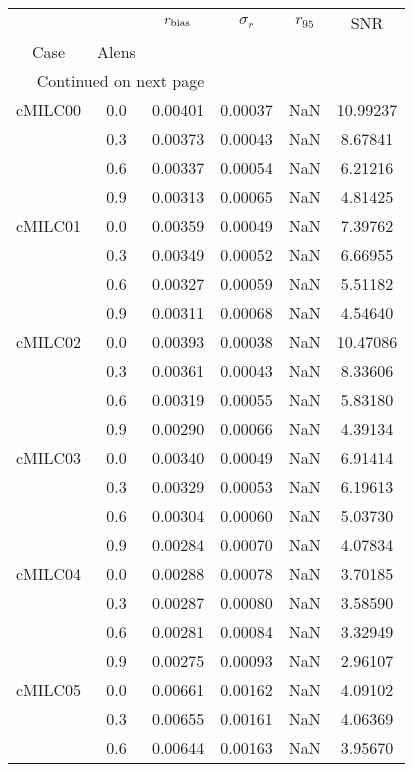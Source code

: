 \begin{longtable}{cccccc}
\toprule
        &     &  $r_{\rm bias}$  &  $\sigma_r$ &  $r_{95}$ &      SNR \\
Case & Alens &                  &             &           &          \\
\midrule
\endhead
\midrule
\multicolumn{3}{r}{{Continued on next page}} \\
\midrule
\endfoot

\bottomrule
\endlastfoot
cMILC00 & 0.0 & 0.00401 & 0.00037 & NaN & 10.99237 \\
        & 0.3 & 0.00373 & 0.00043 & NaN & 8.67841 \\
        & 0.6 & 0.00337 & 0.00054 & NaN & 6.21216 \\
        & 0.9 & 0.00313 & 0.00065 & NaN & 4.81425 \\
cMILC01 & 0.0 & 0.00359 & 0.00049 & NaN & 7.39762 \\
        & 0.3 & 0.00349 & 0.00052 & NaN & 6.66955 \\
        & 0.6 & 0.00327 & 0.00059 & NaN & 5.51182 \\
        & 0.9 & 0.00311 & 0.00068 & NaN & 4.54640 \\
cMILC02 & 0.0 & 0.00393 & 0.00038 & NaN & 10.47086 \\
        & 0.3 & 0.00361 & 0.00043 & NaN & 8.33606 \\
        & 0.6 & 0.00319 & 0.00055 & NaN & 5.83180 \\
        & 0.9 & 0.00290 & 0.00066 & NaN & 4.39134 \\
cMILC03 & 0.0 & 0.00340 & 0.00049 & NaN & 6.91414 \\
        & 0.3 & 0.00329 & 0.00053 & NaN & 6.19613 \\
        & 0.6 & 0.00304 & 0.00060 & NaN & 5.03730 \\
        & 0.9 & 0.00284 & 0.00070 & NaN & 4.07834 \\
cMILC04 & 0.0 & 0.00288 & 0.00078 & NaN & 3.70185 \\
        & 0.3 & 0.00287 & 0.00080 & NaN & 3.58590 \\
        & 0.6 & 0.00281 & 0.00084 & NaN & 3.32949 \\
        & 0.9 & 0.00275 & 0.00093 & NaN & 2.96107 \\
cMILC05 & 0.0 & 0.00661 & 0.00162 & NaN & 4.09102 \\
        & 0.3 & 0.00655 & 0.00161 & NaN & 4.06369 \\
        & 0.6 & 0.00644 & 0.00163 & NaN & 3.95670 \\

\end{longtable}
